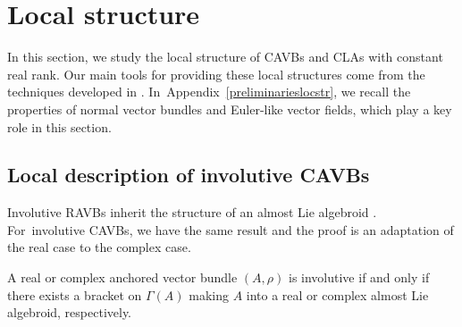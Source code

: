 \section{Local structure}\label{locstr}
In this section, we study the local structure of CAVBs and CLAs with constant real rank. Our main tools for providing these local structures come from the techniques developed in \cite{bursztyn2019splitting}. In~Appendix~\ref{preliminarieslocstr}, we recall the properties of normal vector bundles and Euler-like vector fields, which play a key role in this section.
\subsection{Local description of involutive CAVBs}%
Involutive RAVBs inherit the structure of an almost Lie algebroid \cite[Proposition 3.17]{bursztyn2019splitting}. For~involutive CAVBs, we have the same result and the proof is an adaptation of the real case to the complex case.
\begin{Proposition}
A real or complex anchored vector bundle $(A,\rho)$ is involutive if and only if there exists a bracket on $\Gamma(A)$ making $A$ into a real or complex almost Lie algebroid, respectively.
\end{Proposition}

